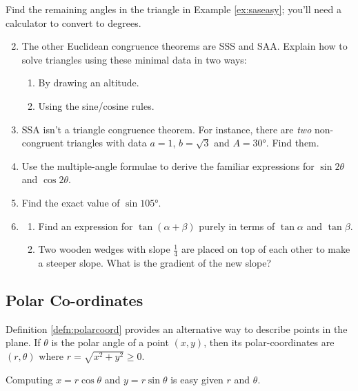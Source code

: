   
\begin{exercises}{}{}
\exstart Find the remaining angles in the triangle in Example \ref{ex:saseasy}; you'll need a calculator to convert to degrees.
\begin{enumerate}\setcounter{enumi}{1}
  \item The other Euclidean congruence theorems are SSS and SAA. Explain how to solve triangles using these minimal data in two ways:
  \begin{enumerate}
    \item By drawing an altitude.
    \item Using the sine/cosine rules.
  \end{enumerate}

  \item SSA isn't a triangle congruence theorem. For instance, there are \emph{two} non-congruent triangles with data $a=1$, $b=\sqrt 3$ and $A=\ang{30}$. Find them.


  \item Use the multiple-angle formulae to derive the familiar expressions for $\sin 2\theta$ and $\cos 2\theta$.
  
  \item Find the exact value of $\sin\ang{105}$.
  
  \item\begin{enumerate}
    \item Find an expression for $\tan(\alpha+\beta)$ purely in terms of $\tan\alpha$ and $\tan\beta$.
  	 \item Two wooden wedges with slope $\frac 14$ are placed on top of each other to make a steeper slope. What is the gradient of the new slope?
  \end{enumerate} 
\end{enumerate}
\end{exercises}


\clearpage


\subsection{Polar Co-ordinates}

Definition \ref{defn:polarcoord} provides an alternative way to describe points in the plane. If $\theta$ is the polar angle of a point $(x,y)$, then its polar-coordinates are $(r,\theta)$ where $r=\sqrt{x^2+y^2}\ge 0$.\smallbreak

Computing $x=r\cos\theta$ and $y=r\sin\theta$ is easy given $r$ and $\theta$.

